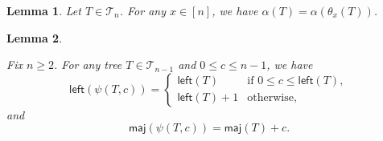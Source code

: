 \documentclass[10pt,a4paper]{amsart}
\newtheorem{lemma}{Lemma}
\def\B{\mathcal{T}}
\def\l{\mathsf{left}}
\def\maj{\mathsf{maj}}
\begin{document}
	 	\begin{lemma}\label{lem-alpha}
	 		Let $T\in \B_n$. For any $x\in [n]$, we have 
	 		$\alpha(T)=\alpha(\theta_x(T))$. 
	 	\end{lemma}

	 	\begin{lemma}\label{lem-psi-1}
	 		
	 	Fix $n\geq 2$. 	For  any tree $T\in \B_{n-1}$ and $0\le c\le n-1$, we have
	 		\[
	 		\l(\psi(T, c))=\left\{ 
	 		\begin{array}{ll}
	 			\l(T) & \mbox{if  $0\leq c\leq \l(T)$},\\[2pt]
	 			\l(T)+1 & \mbox{otherwise},
	 		\end{array}
	 		\right.
	 		\]
	 		and
	 		\[
	 		\maj(\psi(T, c))=\maj(T)+c.
	 		\]
	 		\end{lemma}
\end{document}
